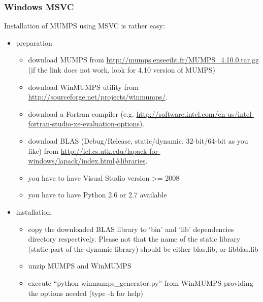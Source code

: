 \documentclass[a4paper,0pt,english]{sphinxmanual}
\begin{document}
\subsubsection{Windows MSVC}
\label{src/installation/matrix_solvers/mumps:windows-msvc}
Installation of MUMPS using MSVC is rather easy:
\begin{itemize}
\item {} 
preparation
\begin{itemize}
\item {} 
download MUMPS from \href{http://mumps.enseeiht.fr/MUMPS\_4.10.0.tar.gz}{http://mumps.enseeiht.fr/MUMPS\_4.10.0.tar.gz} (if the link does not work, look for 4.10 version of MUMPS)

\item {} 
download WinMUMPS utility from \href{http://sourceforge.net/projects/winmumps/}{http://sourceforge.net/projects/winmumps/}.

\item {} 
download a Fortran compiler (e.g. \href{http://software.intel.com/en-us/intel-fortran-studio-xe-evaluation-options)}{http://software.intel.com/en-us/intel-fortran-studio-xe-evaluation-options)}.

\item {} 
download BLAS (Debug/Release, static/dynamic, 32-bit/64-bit as you like) from \href{http://icl.cs.utk.edu/lapack-for-windows/lapack/index.html\#libraries}{http://icl.cs.utk.edu/lapack-for-windows/lapack/index.html\#libraries}.

\item {} 
you have to have Visual Studio version \textgreater{}= 2008

\item {} 
you have to have Python 2.6 or 2.7 available

\end{itemize}

\item {} 
installation
\begin{itemize}
\item {} 
copy the downloaded BLAS library to `bin' and `lib' dependencies directory respectively. Please not that the name of the static library (static part of the dynamic library) should be either blas.lib, or libblas.lib

\item {} 
unzip MUMPS and WinMUMPS

\item {} 
execute ``python winmumps\_generator.py'' from WinMUMPS providing the options needed (type -h for help)


\end{itemize}
\end{itemize}
\end{document}
